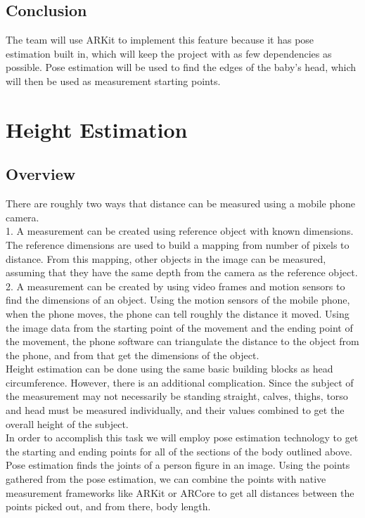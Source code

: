 \documentclass[onecolumn, draftclsnofoot,10pt, compsoc]{IEEEtran}
\begin{document}
\subsection{Conclusion}
The team will use ARKit to implement this feature because it has pose estimation built in, which will keep the project with as few dependencies as possible. Pose estimation will be used to find the edges of the baby's head, which will then be used as measurement starting points.


\section{Height Estimation}

\subsection{Overview}

There are roughly two ways that distance can be measured using a mobile phone camera.\\

1. A measurement can be created using reference object with known dimensions. The reference dimensions are used to build a mapping from number of pixels to distance. From this mapping, other objects in the image can be measured, assuming that they have the same depth from the camera as the reference object\cite{openCV}.\\

2. A measurement can be created by using video frames and motion sensors to find the dimensions of an object. Using the motion sensors of the mobile phone, when the phone moves, the phone can tell roughly the distance it moved. Using the image data from the starting point of the movement and the ending point of the movement, the phone software can triangulate the distance to the object from the phone, and from that get the dimensions of the object.\\

Height estimation can be done using the same basic building blocks as head circumference. However, there is an additional complication. Since the subject of the measurement may not necessarily be standing straight, calves, thighs, torso and head must be measured individually, and their values combined to get the overall height of the subject.\\

In order to accomplish this task we will employ pose estimation technology to get the starting and ending points for all of the sections of the body outlined above. Pose estimation finds the joints of a person figure in an image. Using the points gathered from the pose estimation, we can combine the points with native measurement frameworks like ARKit or ARCore to get all distances between the points picked out, and from there, body length.\\
\end{document}

